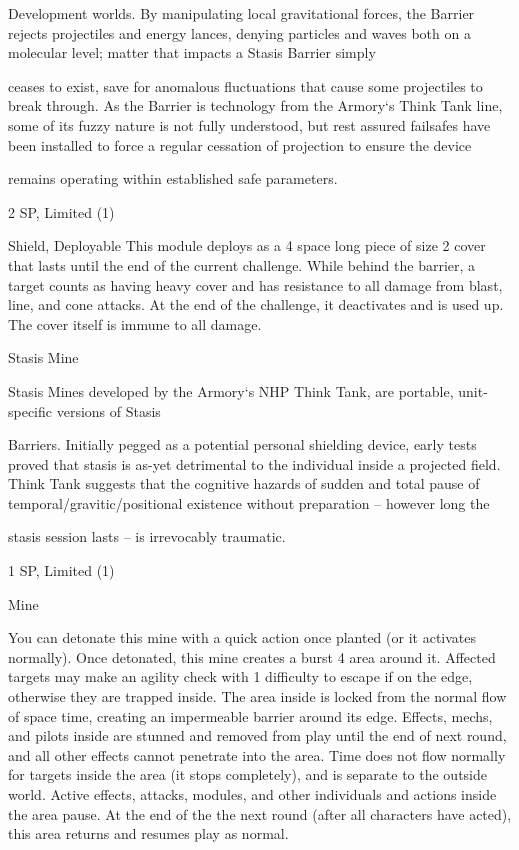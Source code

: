 Development worlds. By manipulating local gravitational forces, the Barrier rejects projectiles and energy  
lances, denying particles and waves both on a molecular level; matter that impacts a Stasis Barrier simply  

ceases to exist, save for anomalous fluctuations that cause some projectiles to break through. As the  
Barrier is technology from the Armory‘s Think Tank line, some of its fuzzy nature is not fully understood, but  
rest assured failsafes have been installed to force a regular cessation of projection to ensure the device  

remains operating within established safe parameters.   

2 SP, Limited (1)  

Shield, Deployable  
This module deploys as a 4 space long piece of size 2 cover that lasts until the end of the current  
challenge. While behind the barrier, a target counts as having heavy cover and has resistance to  
all damage from blast, line, and cone attacks. At the end of the challenge, it deactivates and is  
used up. The cover itself is immune to all damage.
 

Stasis Mine  

Stasis Mines developed by the Armory‘s NHP Think Tank, are portable, unit-specific versions of Stasis  

Barriers. Initially pegged as a potential personal shielding device, early tests proved that stasis is as-yet  
detrimental to the individual inside a projected field. Think Tank suggests that the cognitive hazards of  
sudden and total pause of temporal/gravitic/positional existence without preparation -- however long the  

stasis session lasts -- is irrevocably traumatic.   

1 SP,  Limited (1)
 

Mine
 
You can detonate this mine with a quick action once planted (or it activates normally). Once  
detonated, this mine creates a burst 4 area around it. Affected targets may make an agility check  
with 1 difficulty to escape if on the edge, otherwise they are trapped inside. The area inside is  
locked from the normal flow of space time, creating an impermeable barrier around its edge.  
Effects, mechs, and pilots inside are stunned and removed from play until the end of next round,  
and all other effects cannot penetrate into the area. Time does not flow normally for targets  
inside the area (it stops completely), and is separate to the outside world. Active effects, attacks,  
modules, and other individuals and actions inside the area pause. At the end of the the next  
round (after all characters have acted), this area returns and resumes play as normal.
 

